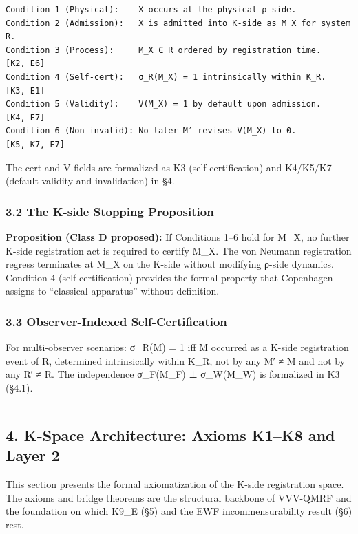 \documentclass[
  11pt,
]{article}
\begin{document}
\begin{verbatim}
Condition 1 (Physical):    X occurs at the physical ρ-side.
Condition 2 (Admission):   X is admitted into K-side as M_X for system R.
Condition 3 (Process):     M_X ∈ R ordered by registration time.          [K2, E6]
Condition 4 (Self-cert):   σ_R(M_X) = 1 intrinsically within K_R.         [K3, E1]
Condition 5 (Validity):    V(M_X) = 1 by default upon admission.           [K4, E7]
Condition 6 (Non-invalid): No later M′ revises V(M_X) to 0.               [K5, K7, E7]
\end{verbatim}

The cert and V fields are formalized as K3 (self-certification) and
K4/K5/K7 (default validity and invalidation) in §4.

\subsubsection{3.2 The K-side Stopping
Proposition}\label{the-k-side-stopping-proposition}

\textbf{Proposition (Class D proposed):} If Conditions 1--6 hold for
M\_X, no further K-side registration act is required to certify M\_X.
The von Neumann registration regress terminates at M\_X on the K-side
without modifying ρ-side dynamics. Condition 4 (self-certification)
provides the formal property that Copenhagen assigns to ``classical
apparatus'' without definition.

\subsubsection{3.3 Observer-Indexed
Self-Certification}\label{observer-indexed-self-certification}

For multi-observer scenarios: σ\_R(M) = 1 iff M occurred as a K-side
registration event of R, determined intrinsically within K\_R, not by
any M′ ≠ M and not by any R′ ≠ R. The independence σ\_F(M\_F) ⊥
σ\_W(M\_W) is formalized in K3 (§4.1).

\begin{center}\rule{0.5\linewidth}{0.5pt}\end{center}

\subsection{4. K-Space Architecture: Axioms K1--K8 and Layer
2}\label{k-space-architecture-axioms-k1k8-and-layer-2}

This section presents the formal axiomatization of the K-side
registration space. The axioms and bridge theorems are the structural
backbone of VVV-QMRF and the foundation on which K9\_E (§5) and the EWF
incommensurability result (§6) rest.
\end{document}

